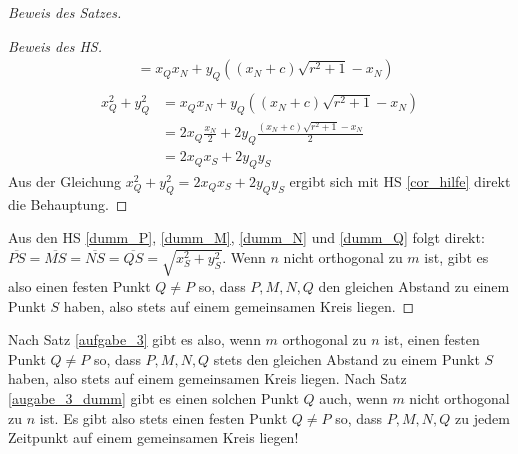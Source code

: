 \begin{proof}[Beweis des Satzes]
\begin{proof}[Beweis des HS]
\begin{align*}
            &=x_Qx_N+y_Q\left((x_N+c)\sqrt{r^2+1}-x_N\right)\\
        \end{align*}
        \begin{align*}
            x_Q^2+y_Q^2&=x_Qx_N+y_Q\left((x_N+c)\sqrt{r^2+1}-x_N\right)\\
            &=2x_Q\frac{x_N}{2}+2y_Q\frac{(x_N+c)\sqrt{r^2+1}-x_N}{2}\\
            &=2x_Qx_S+2y_Qy_S
        \end{align*}
        Aus der Gleichung $x_Q^2+y_Q^2=2x_Qx_S+2y_Qy_S$ ergibt sich mit HS \ref{cor_hilfe} direkt die Behauptung.
    \end{proof}
    Aus den HS \ref{dumm_P}, \ref{dumm_M}, \ref{dumm_N} und \ref{dumm_Q} folgt direkt: 
    $\overline{PS}=\overline{MS}=\overline{NS}=\overline{QS}=\sqrt{x_S^2+y_S^2}$. Wenn $n$ nicht orthogonal zu $m$ 
    ist, gibt es also einen festen Punkt $Q\neq P$ so, dass $P, M, N, Q$ den gleichen Abstand zu einem Punkt $S$ 
    haben, also stets auf einem gemeinsamen Kreis liegen.
    \renewcommand{\qedsymbol}{$\blacksquare$}
\end{proof}

Nach Satz \ref{aufgabe_3} gibt es also,  wenn $m$ orthogonal zu $n$ ist, einen festen Punkt $Q\neq P$ so, dass $P, M, 
N, Q$ stets den gleichen Abstand zu einem Punkt $S$ haben, also stets auf einem gemeinsamen Kreis liegen. 
Nach Satz \ref{augabe_3_dumm} gibt es einen solchen Punkt $Q$ auch, wenn $m$ nicht orthogonal zu $n$ ist. Es gibt 
also stets einen festen Punkt $Q\neq P$ so, dass $P, M, N, Q$ zu jedem Zeitpunkt auf einem gemeinsamen Kreis liegen!